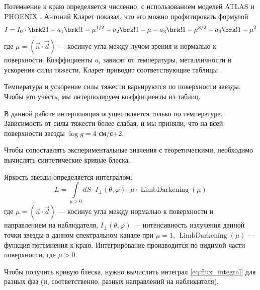 Потемнение к краю определяется численно, с использованием моделей ATLAS \cite{AtlasDarkening} и PHOENIX \cite{PHOENIX}. Антоний Кларет показал, что его можно профитировать формулой
\begin{equation}
I = I_0 \cdot \brk2{
    1 - a_1 \brk!{1 - \mu^{1/2}} - a_2 \brk!{1 - \mu} - a_3 \brk!{1 - \mu^{3/2}} - a_4 \brk!{1 - \mu^2}
}
\label{eq:ClaretDarkening}
\end{equation}
где $\mu = (\vec n \cdot \vec d)$ --- косинус угла между лучом зрения и нормалью к поверхности. Коэффициенты $a_i$ зависят от температуры, металличности и ускорения силы тяжести, Кларет приводит соответствующие таблицы \cite{ClaretDarkening}.

Температура и ускорение силы тяжести варьируются по поверхности звезды. Чтобы это учесть, мы интерполируем коэффициенты из таблиц.

В данной работе интерполяция осуществляется только по температуре. Зависимость от силы тяжести более слабая, и мы приняли, что на всей поверхности звезды $\log g = 4$ см/с+2.



Чтобы сопоставлять экспериментальные значения с теоретическими, необходимо вычислять синтетические кривые блеска.


Яркость звезды определяется интегралом:
\begin{equation}
L = \int\limits_{\mu > 0}
dS \cdot
I_\perp (\theta, \varphi) \cdot \mu \cdot
\operatorname{LimbDarkening}(\mu)
\label{eq:flux_integral}
\end{equation}
где $\mu = (\vec n \cdot \vec d)$ --- косинус угла между нормалью к поверхности и направлением на наблюдателя, $I_\perp(\theta, \varphi)$ --- интенсивность излучения данной точки звезды в данном спектральном канале при $\mu = 1$, $\operatorname{LimbDarkening}(\mu)$ --- функция потемнения к краю. Интегрирование производится по видимой части поверхности, где $\mu > 0$.

Чтобы получить кривую блеска, нужно вычислить интеграл \ref{eq:flux_integral} для разных фаз (и, соответственно, разных направлений на наблюдателя).

